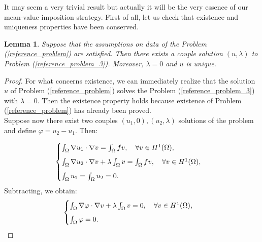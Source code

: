 \documentclass[a4paper,11pt]{article}
\newtheorem{lemma}{Lemma}
\begin{document}
\noindent It may seem a very trivial result but actually it will be the very essence of our mean-value imposition strategy. First of all, let us check that existence and uniqueness properties have been conserved.  \newpage
\begin{lemma} \label{lemma_lagrange}
	Suppose that the assumptions on data of the Problem (\ref{reference_problem}) are satisfied. Then there exists a couple solution $(u,\lambda)$ to Problem (\ref{reference_problem_3}). Moreover, $\lambda=0$ and $u$ is unique. \\
\end{lemma}
\begin{proof}
	For what concerns existence, we can immediately realize that the solution $u$ of Problem (\ref{reference_problem}) solves the Problem (\ref{reference_problem_3}) with $\lambda=0$. Then the existence property holds because existence of Problem (\ref{reference_problem}) has already been proved. \\
	
	\noindent Suppose now there exist two couples $(u_1,0), (u_2,\lambda)$ solutions of the problem and define $\varphi=u_2-u_1$. Then:
	
	\begin{equation*}
	\begin{cases}
	\int_{\Omega}\nabla u_1 \cdot \nabla v = \int_{\Omega} fv, \quad \forall v \in H^1(\Omega),\vspace{2mm} \\
	\int_{\Omega}\nabla u_2 \cdot \nabla v + \lambda \int_\Omega v = \int_{\Omega} fv, \quad \forall v \in H^1(\Omega), \vspace{2mm}\\
	\int_{\Omega}u_1 = \int_{\Omega}u_2 = 0.
	\end{cases}
	\end{equation*}
		Subtracting, we obtain:
	\begin{equation*}
	\begin{cases}
	\int_{\Omega}\nabla \varphi \cdot \nabla v + \lambda \int_\Omega v = 0, \quad \forall v \in H^1(\Omega),\vspace{2mm} \\
	\int_{\Omega}\varphi = 0.
	\end{cases}
	\end{equation*}
	

\end{proof}
\end{document}
